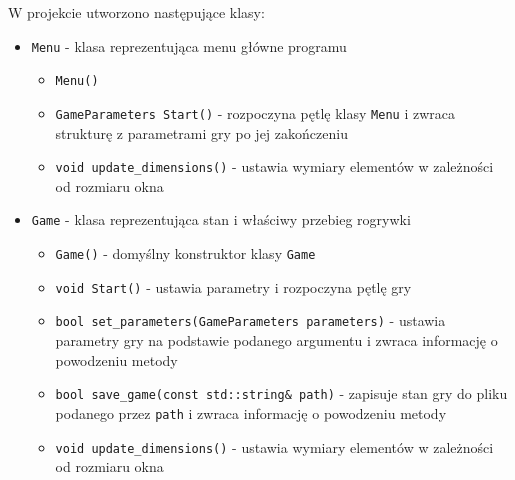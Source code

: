 \documentclass{article}
\begin{document}
W projekcie utworzono następujące klasy:
\begin{itemize}
    \item \texttt{Menu} - klasa reprezentująca menu główne programu
        \begin{itemize}
            \item \texttt{Menu()}
            \item \texttt{GameParameters Start()} - rozpoczyna pętlę klasy \texttt{Menu} i zwraca strukturę z 
            parametrami gry po jej zakończeniu
            \item \texttt{void update\_dimensions()} - ustawia wymiary elementów w zależności od rozmiaru okna
        \end{itemize}

    \item \texttt{Game} - klasa reprezentująca stan i właściwy przebieg rogrywki
        \begin{itemize}
            \item \texttt{Game()} - domyślny konstruktor klasy \texttt{Game}
            \item \texttt{void Start()} - ustawia parametry i rozpoczyna pętlę gry
            \item \texttt{bool set\_parameters(GameParameters parameters)} - ustawia parametry gry na podstawie podanego
            argumentu i zwraca informację o powodzeniu metody
            \item \texttt{bool save\_game(const std::string\& path)} - zapisuje stan gry do pliku podanego przez 
            \texttt{path} i zwraca informację o powodzeniu metody
            \item \texttt{void update\_dimensions()} - ustawia wymiary elementów w zależności od rozmiaru okna
        \end{itemize}


\end{itemize}
\end{document}
